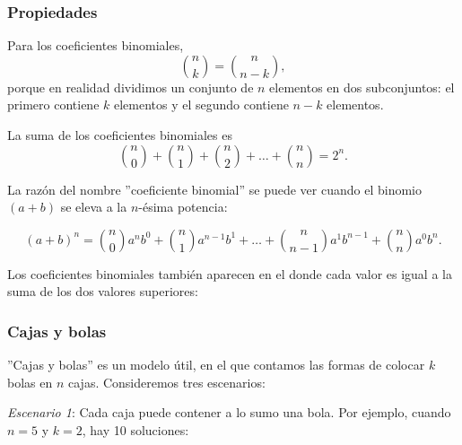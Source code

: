 \subsubsection{Propiedades}

Para los coeficientes binomiales,
\[
{n \choose k}  =  {n \choose n-k},
\]
porque en realidad dividimos un conjunto de $n$ elementos en
dos subconjuntos: el primero contiene $k$ elementos
y el segundo contiene $n-k$ elementos.

La suma de los coeficientes binomiales es
\[
{n \choose 0}+{n \choose 1}+{n \choose 2}+\ldots+{n \choose n}=2^n.
\]

La razón del nombre ''coeficiente binomial''
se puede ver cuando el binomio $(a+b)$ se eleva a
la $n$-ésima potencia:

\[ (a+b)^n =
{n \choose 0} a^n b^0 +
{n \choose 1} a^{n-1} b^1 +
\ldots +
{n \choose n-1} a^1 b^{n-1} +
{n \choose n} a^0 b^n. \]


Los coeficientes binomiales también aparecen en
el 
donde cada valor es igual a la suma de los dos
valores superiores:
\begin{center}
\end{center}

\subsubsection{Cajas y bolas}

''Cajas y bolas'' es un modelo útil,
en el que contamos las formas de
colocar $k$ bolas en $n$ cajas.
Consideremos tres escenarios:

\textit{Escenario 1}: Cada caja puede contener
a lo sumo una bola.
Por ejemplo, cuando $n=5$ y $k=2$,
hay 10 soluciones:

